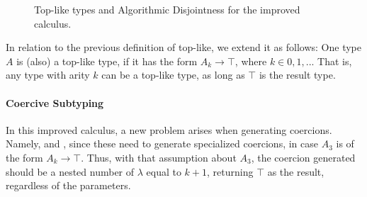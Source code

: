\begin{figure}[h]


  \caption{Top-like types and Algorithmic Disjointness for the improved calculus.}
  \label{fig:disjointness}
\end{figure}


\begin{definition}
  
  In relation to the previous definition of top-like, we extend it as follows:
  One type $A$ is (also) a top-like type, if it has the form $A_k \to \top$, where $k \in {0,1,..}$.
  That is, any type with arity $k$ can be a top-like type, as long as $\top$ is the result type. 

\end{definition}



\paragraph{Coercive Subtyping}

In this improved calculus, a new problem arises when generating coercions. 
Namely,  and , since these need to generate specialized coercions,
in case $A_3$ is of the form $A_k \to \top$. 
Thus, with that assumption about $A_3$, the coercion generated should be a nested number of $\lambda$ equal to $k+1$,
returning $\top$ as the result, regardless of the parameters.


